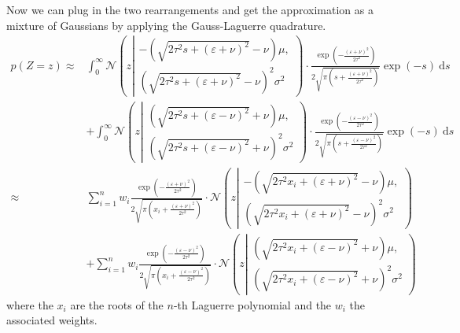 \documentclass[11pt,a4paper]{book}
\newcommand{\ontopof}[2]{
  \begin{array}{c}
    #1,\\#2
  \end{array}
}
\begin{document}
Now we can plug in the two rearrangements and get the approximation as a mixture
of Gaussians by applying the Gauss-Laguerre quadrature.
\begin{align*}
  p(Z = z) \approx& \int_{0}^{\infty} \mathcal{N}\left( z \left| \ontopof{-\left( \sqrt{2\tau^{2}s + (\varepsilon + \nu)^{2}} - \nu \right)\mu}{\left( \sqrt{2\tau^{2}s + (\varepsilon + \nu)^{2}} - \nu \right)^{2}\sigma^{2}} \right.\right) \cdot \frac{\exp\left( -\frac{(\varepsilon + \nu)^{2}}{2\tau^{2}} \right)}{2 \sqrt{\pi \left( s + \frac{(\varepsilon + \nu)^{2}}{2\tau^{2}} \right)}} \exp(-s)~\mathrm{d}s\\
                  & + \int_{0}^{\infty} \mathcal{N}\left( z \left| \ontopof{\left( \sqrt{2\tau^{2} s + (\varepsilon - \nu)^{2}} + \nu \right)\mu}{\left( \sqrt{2\tau^{2} s + (\varepsilon - \nu)^{2}} + \nu \right)^{2}\sigma^{2}} \right.\right) \cdot \frac{\exp\left( -\frac{(\varepsilon - \nu)^{2}}{2\tau^{2}} \right)}{2\sqrt{\pi \left( s + \frac{(\varepsilon - \nu)^{2}}{2\tau^{2}} \right)}} \exp(-s)~\mathrm{d}s\\
  \approx& \sum_{i = 1}^{n} w_{i} \frac{\exp\left( -\frac{(\varepsilon + \nu)^{2}}{2\tau^{2}} \right)}{2 \sqrt{\pi \left( x_{i} + \frac{(\varepsilon + \nu)^{2}}{2\tau^{2}} \right)}} \cdot \mathcal{N}\left( z \left|
           \ontopof{-\left( \sqrt{2\tau^{2}x_{i} + (\varepsilon + \nu)^{2}} - \nu \right)\mu}{\left( \sqrt{2\tau^{2}x_{i} + (\varepsilon + \nu)^{2}} - \nu \right)^{2}\sigma^{2}}
           \right.\right)\\
                  &+ \sum_{i = 1}^{n} w_{i} \frac{\exp\left( -\frac{(\varepsilon - \nu)^{2}}{2\tau^{2}} \right)}{2\sqrt{\pi \left( x_{i} + \frac{(\varepsilon - \nu)^{2}}{2\tau^{2}} \right)}} \cdot \mathcal{N}\left( z \left|
                    \ontopof{\left( \sqrt{2\tau^{2} x_{i} + (\varepsilon - \nu)^{2}} + \nu \right)\mu}{\left( \sqrt{2\tau^{2} x_{i} + (\varepsilon - \nu)^{2}} + \nu \right)^{2}\sigma^{2}}
                    \right.\right)
\end{align*}
where the $x_{i}$ are the roots of the $n$-th Laguerre polynomial and the
$w_{i}$ the associated weights.
\end{document}
